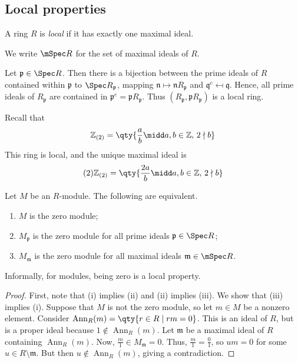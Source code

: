 \subsection{Local properties}
\begin{definition}
    A ring \( R \) is \emph{local} if it has exactly one maximal ideal.
\end{definition}
We write \( \mSpec R \) for the set of maximal ideals of \( R \).
\begin{example}
    Let \( \mathfrak p \in \Spec R \).
    Then there is a bijection between the prime ideals of \( R \) contained within \( \mathfrak p \) to \( \Spec R_{\mathfrak p} \), mapping \( \mathfrak n \mapsto \mathfrak n R_{\mathfrak p} \) and \( \mathfrak q^c \mapsfrom \mathfrak q \).
    Hence, all prime ideals of \( R_{\mathfrak p} \) are contained in \( \mathfrak p^e = \mathfrak p R_{\mathfrak p} \).
    Thus \( (R_{\mathfrak p}, \mathfrak p R_{\mathfrak p}) \) is a local ring.
\end{example}
\begin{example}
    Recall that
    \[ \mathbb Z_{(2)} = \qty{\frac{a}{b} \midd a, b \in \mathbb Z,\, 2 \nmid b} \]
    This ring is local, and the unique maximal ideal is
    \[ (2) \mathbb Z_{(2)} = \qty{\frac{2a}{b} \midd a, b \in \mathbb Z,\, 2 \nmid b} \]
\end{example}
\begin{proposition}
    Let \( M \) be an \( R \)-module.
    The following are equivalent.
    \begin{enumerate}
        \item \( M \) is the zero module;
        \item \( M_{\mathfrak p} \) is the zero module for all prime ideals \( \mathfrak p \in \Spec R \);
        \item \( M_{\mathfrak m} \) is the zero module for all maximal ideals \( \mathfrak m \in \mSpec R \).
    \end{enumerate}
\end{proposition}
Informally, for modules, being zero is a local property.
\begin{proof}
    First, note that (i) implies (ii) and (ii) implies (iii).
    We show that (iii) implies (i).
    Suppose that \( M \) is not the zero module, so let \( m \in M \) be a nonzero element.
    Consider \( \operatorname{Ann}_R(m) = \qty{r \in R \mid rm = 0} \).
    This is an ideal of \( R \), but is a proper ideal because \( 1 \notin \operatorname{Ann}_R(m) \).
    Let \( \mathfrak m \) be a maximal ideal of \( R \) containing \( \operatorname{Ann}_R(m) \).
    Now, \( \frac{m}{1} \in M_{\mathfrak m} = 0 \).
    Thus, \( \frac{m}{1} = \frac{0}{1} \), so \( um = 0 \) for some \( u \in R \setminus \mathfrak m \).
    But then \( u \notin \operatorname{Ann}_R(m) \), giving a contradiction.
\end{proof}
